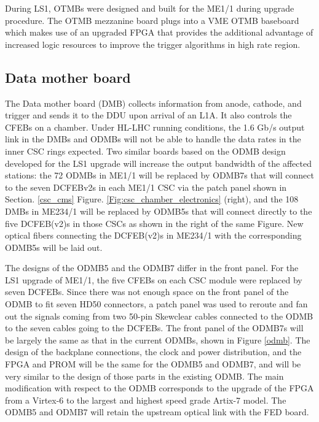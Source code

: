 During LS1,  OTMBs were designed and built for the ME1/1 during upgrade procedure. 
The OTMB mezzanine board plugs into a VME OTMB baseboard which makes %
use of an upgraded FPGA that provides the additional advantage of increased logic resources
to improve the trigger algorithms in high rate region.

\subsection{Data mother board}
The Data mother board (DMB) collects information from anode, 
cathode, and trigger and sends it to the DDU upon arrival of an L1A. It also controls the CFEBs
on a chamber.
Under HL-LHC running conditions, the 1.6 Gb/s output link in the DMBs and ODMBs will not be able
to handle the data rates in the inner CSC rings expected.
Two similar boards based on the ODMB design developed for the LS1 upgrade will increase
the output bandwidth of the affected stations: the 72 ODMBs in ME1/1 will be replaced by
ODMB7s that will connect to the seven DCFEBv2s in each ME1/1 CSC via the patch panel
shown in Section. \ref{csc_cms} Figure. \ref{Fig:csc_chamber_electronics} (right), and the 108 DMBs in ME234/1 will be replaced by ODMB5s that will
connect directly to the five DCFEB(v2)s in those CSCs as shown in the right of the same Figure. 
New optical fibers connecting the DCFEB(v2)s in ME234/1 with the corresponding ODMB5s will be laid out.

The designs of the ODMB5 and the ODMB7 differ in the front panel.
For the LS1 upgrade of ME1/1, the five CFEBs on each CSC module were replaced by seven
DCFEBs. Since there was not enough space on the front panel of the ODMB to fit seven HD50
connectors, a patch panel was used to reroute and fan out the signals coming from two 50-pin
Skewclear cables connected to the ODMB to the seven cables going to the DCFEBs. The front
panel of the ODMB7s will be largely the same as that in the current ODMBs, shown in Figure \ref{odmb}.
The design of the backplane connections, the clock and power distribution, and the FPGA and
PROM will be the same for the ODMB5 and ODMB7, and will be very similar to the design
of those parts in the existing ODMB. The main modification with respect to the ODMB 
corresponds to the upgrade of the FPGA from a Virtex-6 to the largest and highest speed grade Artix-7 model. 
The ODMB5 and ODMB7 will retain the upstream optical link with the FED board.

